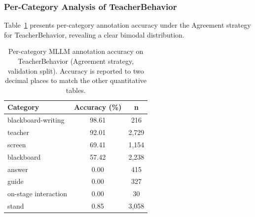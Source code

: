 \documentclass{ieeeaccess}
\begin{document}
\subsubsection{Per-Category Analysis of TeacherBehavior}

Table~\ref{tab:per_class} presents per-category annotation accuracy
under the Agreement strategy for TeacherBehavior, revealing a
clear bimodal distribution.

\begin{table}[!t]
\caption{Per-category MLLM annotation accuracy on TeacherBehavior
(Agreement strategy, validation split). Accuracy is reported to two
decimal places to match the other quantitative tables.}
\label{tab:per_class}
\centering
\begin{tabular}{lcc}
\toprule
\textbf{Category} & \textbf{Accuracy (\%)} & \textbf{n} \\
\midrule
blackboard-writing  & 98.61 & 216  \\
teacher             & 92.01 & 2{,}729 \\
screen              & 69.41 & 1{,}154 \\
blackboard          & 57.42 & 2{,}238 \\
\midrule
answer              &  0.00 & 415  \\
guide               &  0.00 & 327  \\
on-stage interaction &  0.00 & 30   \\
stand               &  0.85 & 3{,}058 \\
\bottomrule
\end{tabular}
\end{table}
\end{document}
